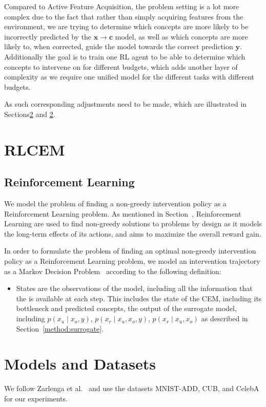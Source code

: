 \documentclass[../main.tex]{subfiles}
\begin{document}
Compared to Active Feature Acquisition, the problem setting is a lot more complex due to the fact that
rather than simply acquiring features from the environment, we are trying to determine
which concepts are more likely to be incorrectly predicted by the $\mathbf{x} \to \mathbf{c}$ model, as well as 
which concepts are more likely to, when corrected, guide the model towards the correct prediction $\mathbf{y}$.
Additionally the goal is to train one RL agent to be able to determine which concepts
to intervene on for different budgets, which adds another layer of complexity as we require
one unified model for the different tasks with different budgets.

As such corresponding adjustments need to be made, which are illustrated in Sections\ref{} and \ref{}.


\section{RLCEM}\label{method:rlcem}


\subsection{Reinforcement Learning}

We model the problem of finding a non-greedy intervention policy as a 
Reinforcement Learning problem. As mentioned in Section~\cite{background:rl},
Reinforcement Learning are used to find non-greedy solutions to problems
by design as it models the long-term effects of its actions, and aims to 
maximize the overall reward gain. 

In order to formulate the problem of finding an optimal non-greedy intervention policy
as a Reinforcement Learning problem, we model an intervention
trajectory as a Markov Decision Problem~\cite{rl-mdp} according
to the following definition:
\begin{itemize}
    \item States are the observations of the model, including all the information that the is available
    at each step. This includes the state of the CEM, including its bottleneck and predicted concepts,
    the output of the surrogate model, including $p(x_u \mid x_o, y)$, $p(x_r \mid x_u, x_o, y)$,
    $p(x_r \mid x_u, x_o)$ as described in Section~\ref{method:surrogate}.
\end{itemize}

\section{Models and Datasets}
We follow Zarlenga et al.~\cite{intcem} and use the datasets MNIST-ADD, CUB, and CelebA for our experiments.
\end{document}
